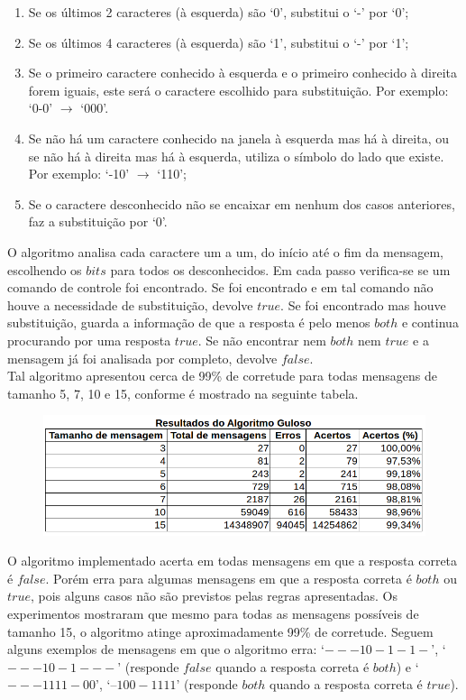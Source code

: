 \documentclass[a4paper,12pt,titlepage]{article}
\begin{document}
\begin{enumerate}[leftmargin=1.5cm]
    \item Se os últimos 2 caracteres (à esquerda) são `0', substitui o `-' por `0';
    \item Se os últimos 4 caracteres (à esquerda) são `1', substitui o `-' por `1';  
    \item Se o primeiro caractere conhecido à esquerda e o primeiro conhecido à direita forem iguais, este será o caractere escolhido para substituição. Por exemplo: `0-0' $\rightarrow$ `000'. 
    \item Se não há um caractere conhecido na janela à esquerda mas há à direita, ou se não há à direita mas há à esquerda, utiliza o símbolo do lado que existe. Por exemplo: `-10' $\rightarrow$ `110'; 
    \item Se o caractere desconhecido não se encaixar em nenhum dos casos anteriores, faz a substituição por `0'.
\end{enumerate}

O algoritmo analisa cada caractere um a um, do início até o fim da mensagem, escolhendo os $bits$ para todos os desconhecidos. Em cada passo verifica-se se um comando de controle foi encontrado. Se foi encontrado e em tal comando não houve a necessidade de substituição, devolve $true$. Se foi encontrado mas houve substituição, guarda a informação de que a resposta é pelo menos $both$ e continua procurando por uma resposta $true$. Se não encontrar nem $both$ nem $true$ e a mensagem já foi analisada por completo, devolve $false$. \\

Tal algoritmo apresentou cerca de 99\% de corretude para todas mensagens de tamanho 5, 7, 10 e 15, conforme é mostrado na seguinte tabela.

\begin{figure}[H]
     \centering
     \includegraphics[scale=0.5]{figures/resultados-guloso.png}
\end{figure}

O algoritmo implementado acerta em todas mensagens em que a resposta correta é $false$. Porém erra para algumas mensagens em que a resposta correta é $both$ ou $true$, pois alguns casos não são previstos pelas regras apresentadas. Os experimentos mostraram que mesmo para todas as mensagens possíveis de tamanho 15, o algoritmo atinge aproximadamente 99\% de corretude. Seguem alguns exemplos de mensagens em que o algoritmo erra: `$---10-1-1-$', `$---10-1---$' (responde $false$ quando a resposta correta é $both$) e `$---1111-00$', `--$100-1111$' (responde $both$ quando a resposta correta é $true$). \\
\end{document}
